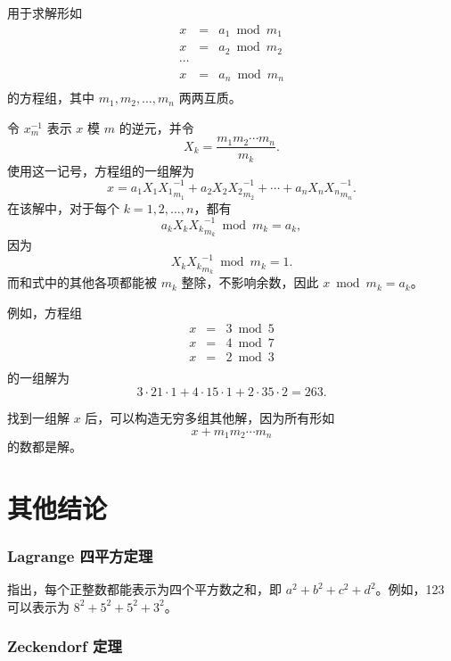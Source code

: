 
用于求解形如
\[
\begin{array}{lcl}
x & = & a_1 \bmod m_1 \\
x & = & a_2 \bmod m_2 \\
\cdots \\
x & = & a_n \bmod m_n \\
\end{array}
\]
的方程组，其中 $m_1,m_2,\ldots,m_n$ 两两互质。

令 $x^{-1}_m$ 表示 $x$ 模 $m$ 的逆元，并令
\[ X_k = \frac{m_1 m_2 \cdots m_n}{m_k}.\]
使用这一记号，方程组的一组解为
\[x = a_1 X_1 {X_1}^{-1}_{m_1} + a_2 X_2 {X_2}^{-1}_{m_2} + \cdots + a_n X_n {X_n}^{-1}_{m_n}.\]
在该解中，对于每个 $k=1,2,\ldots,n$，都有
\[a_k X_k {X_k}^{-1}_{m_k} \bmod m_k = a_k,\]
因为
\[X_k {X_k}^{-1}_{m_k} \bmod m_k = 1.\]
而和式中的其他各项都能被 $m_k$ 整除，不影响余数，因此 $x \bmod m_k = a_k$。

例如，方程组
\[
\begin{array}{lcl}
x & = & 3 \bmod 5 \\
x & = & 4 \bmod 7 \\
x & = & 2 \bmod 3 \\
\end{array}
\]
的一组解为
\[ 3 \cdot 21 \cdot 1 + 4 \cdot 15 \cdot 1 + 2 \cdot 35 \cdot 2 = 263.\]

找到一组解 $x$ 后，可以构造无穷多组其他解，因为所有形如
\[x+m_1 m_2 \cdots m_n\]
的数都是解。

\section{其他结论}

\subsubsection{Lagrange 四平方定理}


指出，每个正整数都能表示为四个平方数之和，即 $a^2+b^2+c^2+d^2$。例如，123 可以表示为 $8^2+5^2+5^2+3^2$。

\subsubsection{Zeckendorf 定理}


